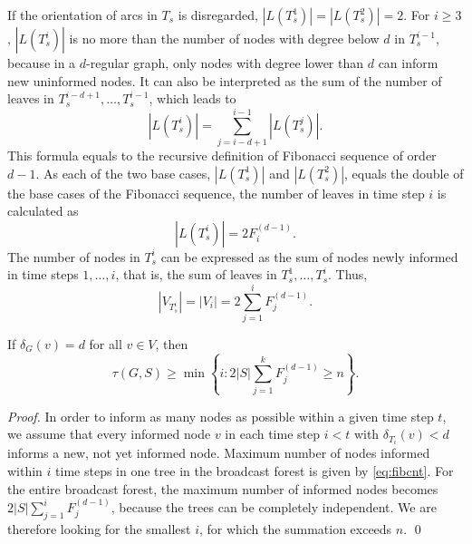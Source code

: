 If the orientation of arcs in $T_s$ is disregarded, $|L(T^1_s)|=|L(T^2_s)|=2$.
For $i\geq 3$, $|L(T^i_s)|$ is no more than the number of nodes with degree below $d$ in $T^{i-1}_s$, 
because in a $d$-regular graph, only nodes with degree lower than $d$ can inform new uninformed nodes.
It can also be interpreted as the sum of the number of leaves in $T^{i-d+1}_s,\dots,T^{i-1}_s$, which leads to %
\begin{equation*}
\label{eq:leafrec}
|L(T^i_s)|=\sum\limits_{j=i-d+1}^{i-1} |L(T^j_s)|.
\end{equation*}  
This formula equals to the recursive definition of Fibonacci sequence of order $d-1$.
As each of the two base cases, $|L(T^1_s)|$ and $|L(T^2_s)|$, equals the double of the base cases of the Fibonacci sequence, the number of leaves in time step $i$ is calculated as
\begin{equation*}
\label{eq:fibleaf}
|L(T^i_s)|=2 F^{(d-1)}_i.
\end{equation*}  
The number of nodes in $T^i_s$ can be expressed as the sum of nodes newly informed in time steps $1,\dots,i$, that is, the sum of leaves in $T^1_s,\dots,T^i_s$. Thus,
\begin{equation}
\label{eq:fibcnt}
|V_{T^i_s}|=|V_i|=2\sum\limits_{j=1}^i F^{(d-1)}_j.
\end{equation}

\begin{proposition}
	If $\delta_G(v)=d$ for all $v\in V$, then 
\begin{equation*}
\label{lem:lbreg1}
	\tau(G,S)\geq\min\left\{i:2|S|\sum\limits_{j=1}^kF^{(d-1)}_j\geq n\right\}.
\end{equation*}
\label{prop:lbfib}
\end{proposition}
\begin{proof}
In order to inform as many nodes as possible within a given time step $t$,
we assume that every informed node $v$ in each time step $i<t$ with $\delta_{T_i}(v)<d$ informs a new, not yet informed node.
Maximum number of nodes informed within $i$ time steps in one tree in the broadcast forest is given by \eqref{eq:fibcnt}.
For the entire broadcast forest, the maximum number of informed nodes becomes $2|S|\sum\limits_{j=1}^i F^{(d-1)}_j$, because the trees can be completely independent.
We are therefore looking for the smallest $i$, for which the summation exceeds $n$.
\qed
\end{proof}

